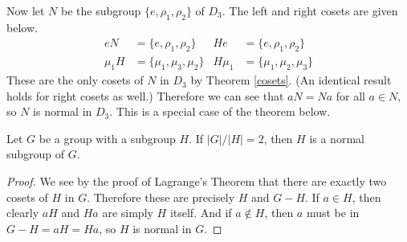 \begin{example}
\label{normal_d3}
Now let $N$ be the subgroup $\{e, \rho_1, \rho_2\}$ of $D_3$. The left and right cosets are given below.
\begin{align*}
    eN      &= \{e, \rho_1, \rho_2\}   & He &= \{e, \rho_1, \rho_2\} \\
    \mu_1 H &= \{\mu_1, \mu_3, \mu_2\} & H \mu_1 &= \{\mu_1, \mu_2, \mu_3\}
\end{align*}
These are the only cosets of $N$ in $D_3$ by Theorem \ref{cosets}. (An identical result holds for right cosets as well.) Therefore we can see that $aN = Na$ for all $a \in N$, so $N$ is normal in $D_3$. This is a special case of the theorem below.
\end{example}

\begin{theorem}
Let \extra $G$ be a group with a subgroup $H$. If $|G|/|H| = 2$, then $H$ is a normal subgroup of $G$.
\end{theorem}

\begin{proof}
We see by the proof of Lagrange's Theorem that there are exactly two cosets of $H$ in $G$. Therefore these are precisely $H$ and $G - H$. If $a \in H$, then clearly $aH$ and $Ha$ are simply $H$ itself. And if $a \notin H$, then $a$ must be in $G-H = aH = Ha$, so $H$ is normal in $G$. 
\end{proof}